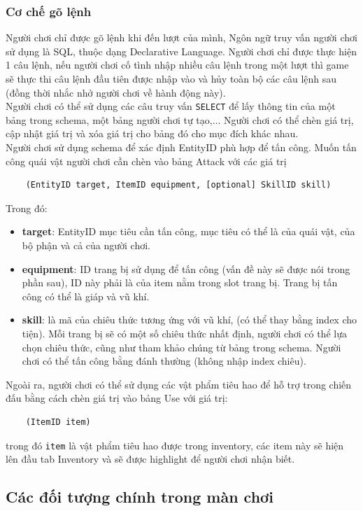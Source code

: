 \subsubsection{Cơ chế gõ lệnh}
\hspace*{1cm}Người chơi chỉ được gõ lệnh khi đến lượt của mình, Ngôn ngữ truy vấn người chơi sử dụng là SQL, thuộc dạng Declarative Language. Người chơi chỉ được thực hiện 1 câu lệnh, nếu người chơi cố tình nhập nhiều câu lệnh trong một lượt thì game sẽ thực thi câu lệnh đầu tiên được nhập vào và hủy toàn bộ các câu lệnh sau (đồng thời nhắc nhở người chơi về hành động này).\\
\hspace*{1cm} Người chơi có thể sử dụng các câu truy vấn \texttt{SELECT} để lấy thông tin của một bảng trong schema, một bảng người chơi tự tạo,... Người chơi có thể chèn giá trị, cập nhật giá trị và xóa giá trị cho bảng đó cho mục đích khác nhau.\\
\hspace*{1cm} Người chơi sử dụng schema để xác định EntityID phù hợp để tấn công. Muốn tấn công quái vật người chơi cần chèn vào bảng Attack với các giá trị 
\begin{verbatim}
	(EntityID target, ItemID equipment, [optional] SkillID skill)
\end{verbatim}
Trong đó:
\begin{itemize}
	\item \textbf{target}: EntityID mục tiêu cần tấn công, mục tiêu có thể là của quái vật, của bộ phận và cả của người chơi.
	\item \textbf{equipment}: ID trang bị sử dụng để tấn công (vấn đề này sẽ được nói trong phần sau), ID này phải là của item nằm trong slot trang bị. Trang bị tấn công có thể là giáp và vũ khí.
	\item \textbf{skill}: là mã của chiêu thức tương ứng với vũ khí, (có thể thay bằng index cho tiện). Mỗi trang bị sẽ có một số chiêu thức nhất định, người chơi có thể lựa chọn chiêu thức, cũng như tham khảo chúng từ bảng trong schema. Người chơi có thể tấn công bằng đánh thường (không nhập index chiêu).
\end{itemize}

Ngoài ra, người chơi có thể sử dụng các vật phẩm tiêu hao để hỗ trợ trong chiến đấu bằng cách chèn giá trị vào bảng Use với giá trị:
\begin{verbatim}
	(ItemID item)
\end{verbatim}
trong đó \texttt{item} là vật phẩm tiêu hao được trong inventory, các item này sẽ hiện lên đầu tab Inventory và sẽ được highlight để người chơi nhận biết.
\subsection{Các đối tượng chính trong màn chơi}